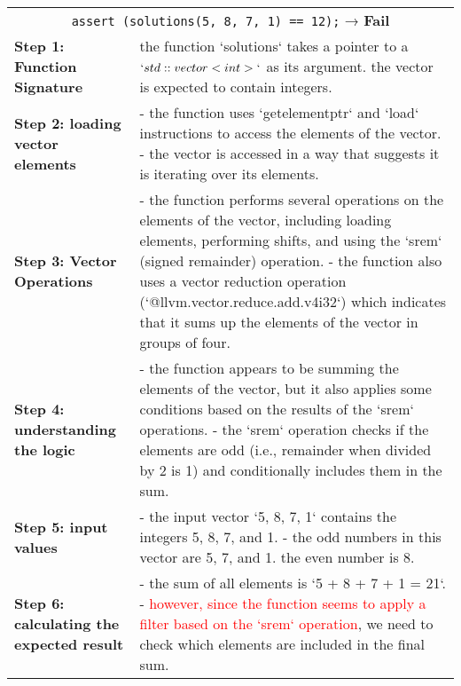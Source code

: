 \begin{table}[h]
    \centering
    \renewcommand{\arraystretch}{1.3} %
    \begin{tabular}{|m{6cm}|m{10cm}|}
        \hline
        \rowcolor{gray!20} \multicolumn{2}{|c|}{\textbf{Reasoning log}} \\ 
        \hline
        \multicolumn{2}{|c|}{\texttt{assert (solutions({5, 8, 7, 1}) == 12);} \quad → \quad \textbf{Fail}} \\ 
        \hline
        \textbf{Step 1: Function Signature} & the function `solutions` takes a pointer to a $`std::vector<int>`$ as its argument. the vector is expected to contain integers.\\
        \hline
        \textbf{Step 2: loading vector elements} & 
        - the function uses `getelementptr` and `load` instructions to access the elements of the vector. \newline
        - the vector is accessed in a way that suggests it is iterating over its elements. \\ 
        \hline
        \textbf{Step 3: Vector Operations} & 
        - the function performs several operations on the elements of the vector, including loading elements, performing shifts, and using the `srem` (signed remainder) operation. \newline
        - the function also uses a vector reduction operation (`@llvm.vector.reduce.add.v4i32`) which indicates that it sums up the elements of the vector in groups of four. \\ 
        \hline
        \textbf{Step 4: understanding the logic} & 
        - the function appears to be summing the elements of the vector, but it also applies some conditions based on the results of the `srem` operations. \newline
        - the `srem` operation checks if the elements are odd (i.e., remainder when divided by 2 is 1) and conditionally includes them in the sum. \\ 
        \hline
        \textbf{Step 5: input values} &
        - the input vector `{5, 8, 7, 1}` contains the integers 5, 8, 7, and 1.\newline
        - the odd numbers in this vector are 5, 7, and 1. the even number is 8.\\
        \hline
        \textbf{Step 6: calculating the expected result}&
        - the sum of all elements is `5 + 8 + 7 + 1 = 21`.\newline
        - \textcolor{red}{however, since the function seems to apply a filter based on the `srem` operation}, we need to check which elements are included in the final sum.\newline

\end{tabular}
\end{table}
